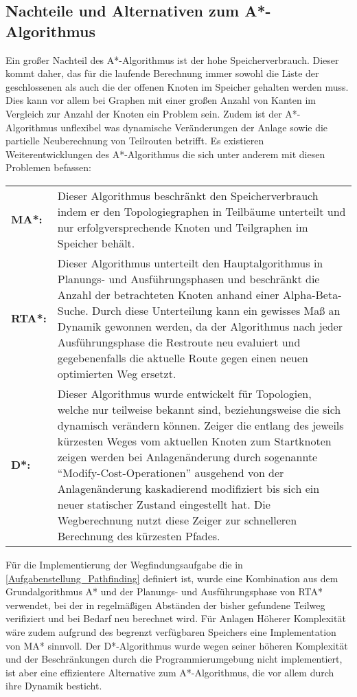 	\subsection{Nachteile und Alternativen zum A*-Algorithmus}
		\label{A*Speicher}
		Ein großer Nachteil des A*-Algorithmus ist der hohe Speicherverbrauch. Dieser kommt daher, das für die laufende Berechnung immer sowohl die Liste der geschlossenen als auch die der offenen Knoten im Speicher gehalten werden muss. Dies kann vor allem bei Graphen mit einer großen Anzahl von Kanten im Vergleich zur Anzahl der Knoten ein Problem sein. Zudem ist der A*-Algorithmus unflexibel was dynamische Veränderungen der Anlage sowie die partielle Neuberechnung von Teilrouten betrifft. Es existieren Weiterentwicklungen des A*-Algorithmus die sich unter anderem mit diesen Problemen befassen:
		
		\begin{tabular}{p{2.5cm} p{10cm}}
			\textbf{\ac{MA*}\cite{Chakrabarti1989}:} &	Dieser Algorithmus beschränkt den Speicherverbrauch indem er den Topologiegraphen in Teilbäume unterteilt und nur erfolgversprechende Knoten und Teilgraphen im Speicher behält.\\[0.5cm]
			\textbf{\ac{RTA*}\cite{Korf1990}:} & Dieser Algorithmus unterteilt den Hauptalgorithmus in  Planungs- und Ausführungsphasen und beschränkt die Anzahl der betrachteten Knoten anhand einer Alpha-Beta-Suche. Durch diese Unterteilung kann ein gewisses Maß an Dynamik gewonnen werden, da der Algorithmus nach jeder Ausführungsphase die Restroute neu evaluiert und gegebenenfalls die aktuelle Route gegen einen neuen optimierten Weg ersetzt.\\[0.5cm]
			\textbf{\ac{D*}\cite{DStarAlg}\cite{Koenig2005}:} & Dieser Algorithmus wurde entwickelt für Topologien, welche nur teilweise bekannt sind, beziehungsweise die sich dynamisch verändern können. Zeiger die entlang des jeweils kürzesten Weges vom aktuellen Knoten zum Startknoten zeigen werden bei Anlagenänderung durch sogenannte "`Modify-Cost-Operationen"' ausgehend von der Anlagenänderung kaskadierend modifiziert bis sich ein neuer statischer Zustand eingestellt hat. Die Wegberechnung nutzt diese Zeiger zur schnelleren Berechnung des kürzesten Pfades.\\[0.5cm]
			
		\end{tabular}
		
		Für die Implementierung der Wegfindungsaufgabe die in \ref{Aufgabenstellung_Pathfinding} definiert ist, wurde eine Kombination aus dem Grundalgorithmus A* und der Planungs- und Ausführungsphase von \ac{RTA*} verwendet, bei der in regelmäßigen Abständen der bisher gefundene Teilweg verifiziert und bei Bedarf neu berechnet wird. Für Anlagen Höherer Komplexität wäre zudem aufgrund des begrenzt verfügbaren Speichers eine Implementation von \ac{MA*} sinnvoll. Der \ac{D*}-Algorithmus wurde wegen seiner höheren Komplexität und der Beschränkungen durch die Programmierumgebung nicht implementiert, ist aber eine effizientere Alternative zum A*-Algorithmus, die vor allem durch ihre Dynamik besticht.
		
				





